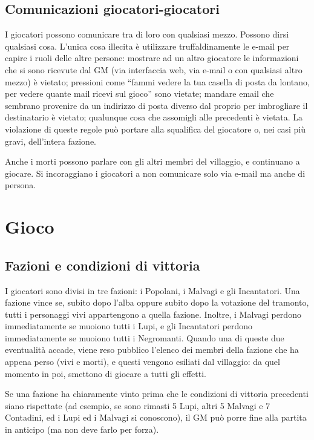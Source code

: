 \documentclass[a4paper,10pt]{article}
\begin{document}
\subsection{Comunicazioni giocatori-giocatori}

I giocatori possono comunicare tra di loro con qualsiasi mezzo. Possono dirsi qualsiasi cosa.
L’unica cosa illecita è utilizzare truffaldinamente le e-mail per capire i ruoli delle altre persone: mostrare ad un altro giocatore le informazioni che si sono ricevute dal GM (via interfaccia web, via e-mail o con qualsiasi altro mezzo) è vietato; pressioni come ``fammi vedere la tua casella di posta da lontano, per vedere quante mail ricevi sul gioco'' sono vietate; mandare email che sembrano provenire da un indirizzo di posta diverso dal proprio per imbrogliare il destinatario è vietato; qualunque cosa che assomigli alle precedenti è vietata. La violazione di queste regole può portare alla squalifica del giocatore o, nei casi più gravi, dell'intera fazione.

Anche i morti possono parlare con gli altri membri del villaggio, e continuano a giocare. Si incoraggiano i giocatori a non comunicare solo via e-mail ma anche di persona.


\pagebreak
\section{Gioco}


\subsection{Fazioni e condizioni di vittoria}

I giocatori sono divisi in tre fazioni: i Popolani, i Malvagi e gli Incantatori.
Una fazione vince se, subito dopo l'alba oppure subito dopo la votazione del tramonto, tutti i personaggi vivi appartengono a quella fazione.
Inoltre, i Malvagi perdono immediatamente se muoiono tutti i Lupi, e gli Incantatori perdono immediatamente se muoiono tutti i Negromanti. Quando una di queste due eventualità accade, viene reso pubblico l'elenco dei membri della fazione che ha appena perso (vivi e morti), e questi vengono esiliati dal villaggio: da quel momento in poi, smettono di giocare a tutti gli effetti.

Se una fazione ha chiaramente vinto prima che le condizioni di vittoria precedenti siano rispettate (ad esempio, se sono rimasti 5 Lupi, altri 5 Malvagi e 7 Contadini, ed i Lupi ed i Malvagi si conoscono), il GM può porre fine alla partita in anticipo (ma non deve farlo per forza).
\end{document}
